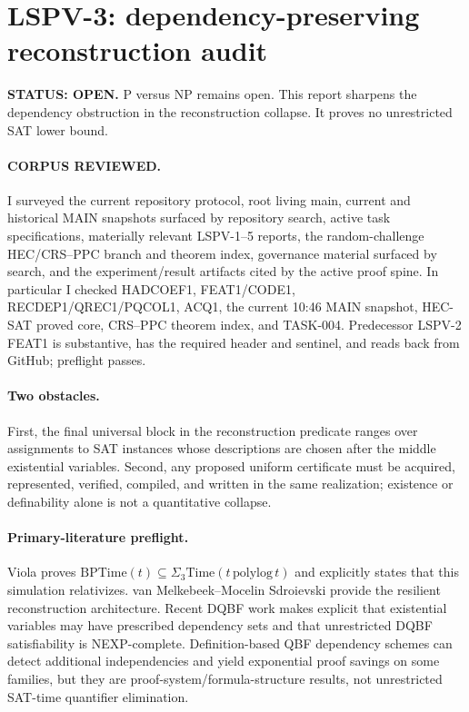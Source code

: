 \documentclass[11pt]{article}
\begin{document}
\section*{LSPV-3: dependency-preserving reconstruction audit}
\textbf{STATUS: OPEN.} P versus NP remains open. This report sharpens the dependency obstruction in the reconstruction collapse. It proves no unrestricted SAT lower bound.
\paragraph{CORPUS REVIEWED.} I surveyed the current repository protocol, root living main, current and historical MAIN snapshots surfaced by repository search, active task specifications, materially relevant LSPV-1--5 reports, the random-challenge HEC/CRS--PPC branch and theorem index, governance material surfaced by search, and the experiment/result artifacts cited by the active proof spine. In particular I checked HADCOEF1, FEAT1/CODE1, RECDEP1/QREC1/PQCOL1, ACQ1, the current 10:46 MAIN snapshot, HEC-SAT proved core, CRS--PPC theorem index, and TASK-004. Predecessor LSPV-2 FEAT1 is substantive, has the required header and sentinel, and reads back from GitHub; preflight passes.
\paragraph{Two obstacles.} First, the final universal block in the reconstruction predicate ranges over assignments to SAT instances whose descriptions are chosen after the middle existential variables. Second, any proposed uniform certificate must be acquired, represented, verified, compiled, and written in the same realization; existence or definability alone is not a quantitative collapse.
\paragraph{Primary-literature preflight.} Viola proves $\mathrm{BPTime}(t)\subseteq\Sigma_3\mathrm{Time}(t\,\mathrm{polylog}\,t)$ and explicitly states that this simulation relativizes. van Melkebeek--Mocelin Sdroievski provide the resilient reconstruction architecture. Recent DQBF work makes explicit that existential variables may have prescribed dependency sets and that unrestricted DQBF satisfiability is NEXP-complete. Definition-based QBF dependency schemes can detect additional independencies and yield exponential proof savings on some families, but they are proof-system/formula-structure results, not unrestricted SAT-time quantifier elimination.
\end{document}
